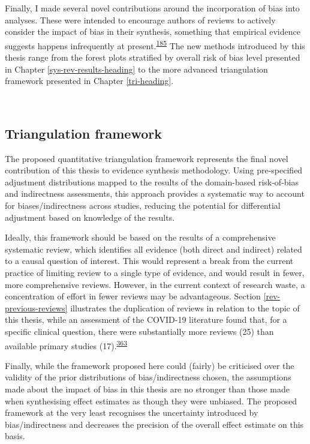 \documentclass[a4paper, twoside]{templates/ociamthesis}
\begin{document}
Finally, I made several novel contributions around the incorporation of bias into analyses. These were intended to encourage authors of reviews to actively consider the impact of bias in their synthesis, something that empirical evidence suggests happens infrequently at present.\textsuperscript{\protect\hyperlink{ref-katikireddi2015}{185}} The new methods introduced by this thesis range from the forest plots stratified by overall risk of bias level presented in Chapter \ref{sys-rev-results-heading} to the more advanced triangulation framework presented in Chapter \ref{tri-heading}.

~

\hypertarget{triangulation-framework}{%
\subsection{Triangulation framework}\label{triangulation-framework}}

The proposed quantitative triangulation framework represents the final novel contribution of this thesis to evidence synthesis methodology. Using pre-specified adjustment distributions mapped to the results of the domain-based risk-of-bias and indirectness assessments, this approach provides a systematic way to account for biases/indirectness across studies, reducing the potential for differential adjustment based on knowledge of the results.

Ideally, this framework should be based on the results of a comprehensive systematic review, which identifies all evidence (both direct and indirect) related to a causal question of interest. This would represent a break from the current practice of limiting review to a single type of evidence, and would result in fewer, more comprehensive reviews. However, in the current context of research waste, a concentration of effort in fewer reviews may be advantageous. Section \ref{rev-previous-reviews} illustrates the duplication of reviews in relation to the topic of this thesis, while an assessment of the COVID-19 literature found that, for a specific clinical question, there were substantially more reviews (25) than available primary studies (17).\textsuperscript{\protect\hyperlink{ref-perez-gaxiola2021}{363}}

Finally, while the framework proposed here could (fairly) be criticised over the validity of the prior distributions of bias/indirectness chosen, the assumptions made about the impact of bias in this thesis are no stronger than those made when synthesising effect estimates as though they were unbiased. The proposed framework at the very least recognises the uncertainty introduced by bias/indirectness and decreases the precision of the overall effect estimate on this basis.
\end{document}
